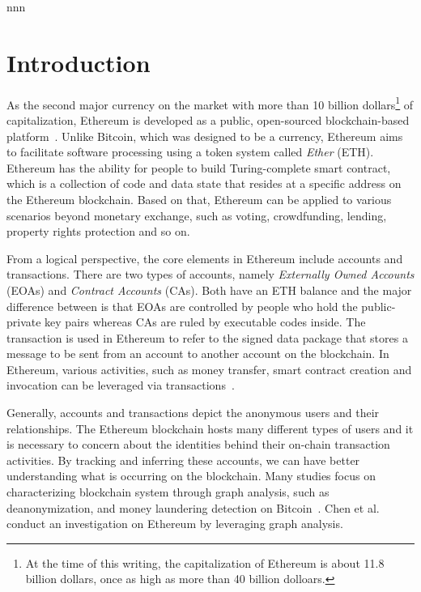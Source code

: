 nnn
\section{Introduction}

As the second major currency on the market with more than 10 billion dollars\footnote{At the time of this writing, the capitalization of Ethereum is about 11.8 billion dollars, once as high as more than 40 billion dolloars.} of capitalization, Ethereum is developed as a public, open-sourced blockchain-based platform~\cite{buterin2013ethereum}. Unlike Bitcoin, which was designed to be a currency, Ethereum aims to facilitate software processing using a token system called \emph{Ether} (ETH). Ethereum has the ability for people to build Turing-complete smart contract, which is a collection of code and data state that resides at a specific address on the Ethereum blockchain. Based on that, Ethereum can be applied to various scenarios beyond monetary exchange, such as voting, crowdfunding, lending, property rights protection and so on.

From a logical perspective, the core elements in Ethereum include accounts and transactions. There are two types of accounts, namely \emph{Externally Owned Accounts} (EOAs) and \emph{Contract Accounts} (CAs). Both have an ETH balance and the major difference between is that EOAs are controlled by people who hold the public-private key pairs whereas CAs are ruled by executable codes inside. The transaction is used in Ethereum to refer to the signed data package that stores a message to be sent from an account to another account on the blockchain. In Ethereum, various activities, such as money transfer, smart contract creation and invocation can be leveraged via transactions~\cite{chen2018infocom}.

Generally, accounts and transactions depict the anonymous users and their relationships. The Ethereum blockchain hosts many different types of users and it is necessary to concern about the identities behind their on-chain transaction activities. By tracking and inferring these accounts, we can have better understanding what is occurring on the blockchain. Many studies focus on characterizing blockchain system through graph analysis, such as deanonymization, and money laundering detection on Bitcoin~\cite{zhao2015graph,maesa2016analysis}. Chen et al.~\cite{chen2018infocom} conduct an investigation on Ethereum by leveraging graph analysis.

